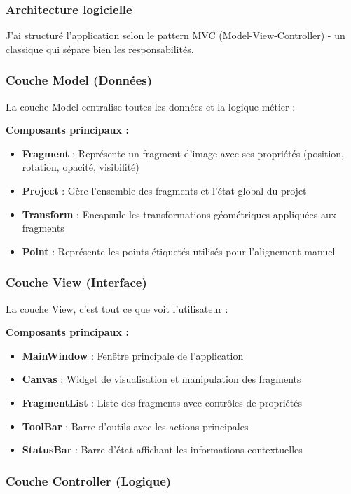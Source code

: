 \documentclass[11pt,a4paper]{report}
\begin{document}
\subsubsection{Architecture logicielle}

J'ai structuré l'application selon le pattern MVC (Model-View-Controller) - un classique qui sépare bien les responsabilités.

\subsubsection{Couche Model (Données)}

La couche Model centralise toutes les données et la logique métier :

\textbf{Composants principaux :}
\begin{itemize}
\item \textbf{Fragment} : Représente un fragment d'image avec ses propriétés (position, rotation, opacité, visibilité)
\item \textbf{Project} : Gère l'ensemble des fragments et l'état global du projet
\item \textbf{Transform} : Encapsule les transformations géométriques appliquées aux fragments
\item \textbf{Point} : Représente les points étiquetés utilisés pour l'alignement manuel
\end{itemize}

\subsubsection{Couche View (Interface)}

La couche View, c'est tout ce que voit l'utilisateur :

\textbf{Composants principaux :}
\begin{itemize}
\item \textbf{MainWindow} : Fenêtre principale de l'application
\item \textbf{Canvas} : Widget de visualisation et manipulation des fragments
\item \textbf{FragmentList} : Liste des fragments avec contrôles de propriétés
\item \textbf{ToolBar} : Barre d'outils avec les actions principales
\item \textbf{StatusBar} : Barre d'état affichant les informations contextuelles
\end{itemize}

\subsubsection{Couche Controller (Logique)}
\end{document}
